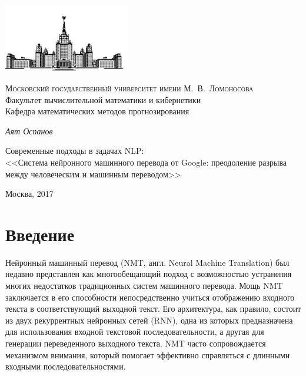 \documentclass[12pt, a4paper]{article}
\begin{document}
    \thispagestyle{empty}

    \begin{singlespace}
    \begin{titlepage}
        \begin{center}
            \includegraphics[height = 3cm]{msu.png}

            {\scshape Московский государственный университет имени М.~В.~Ломоносова}\\
            Факультет вычислительной математики и кибернетики\\
            Кафедра математических методов прогнозирования\\
            \centerline{\hfill\hrulefill\hrulefill\hrulefill\hrulefill\hfill}

            \vfill

            {\Large \textit{Аят Оспанов}}

            \vspace{1mm}

            {\LARGE Современные подходы в задачах NLP:\\
            <<Система нейронного машинного перевода от Google: преодоление разрыва между человеческим и машинным переводом>>}


        \end{center}

        \vfill
        \vfill

        \begin{center}
            Москва, 2017
        \end{center}
    \end{titlepage}
    \end{singlespace}

    \newpage
    \tableofcontents

    \newpage
    \section{Введение}
        Нейронный машинный перевод (NMT, англ. Neural Machine Translation) был недавно представлен как многообещающий подход с возможностью устранения многих недостатков традиционных систем машинного перевода. Мощь NMT заключается в его способности непосредственно учиться отображению входного текста в соответствующий выходной текст. Его архитектура, как правило, состоит из двух рекуррентных нейронных сетей (RNN), одна из которых предназначена для использования входной текстовой последовательности, а другая для генерации переведенного выходного текста. NMT часто сопровождается механизмом внимания, который помогает эффективно справляться с длинными входными последовательностями.
\end{document}
